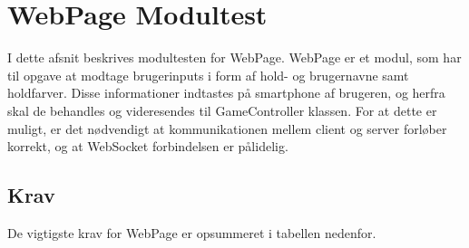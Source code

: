 \documentclass[Modultest/Modultest_main.tex]{subfiles}
\begin{document}
\lstset{style=customc}

\section{WebPage Modultest}\label{webpage_modultest}
I dette afsnit beskrives modultesten for WebPage. WebPage er et modul, som har til opgave at modtage brugerinputs i form af hold- og brugernavne samt holdfarver. Disse informationer indtastes på smartphone af brugeren, og herfra skal de behandles og videresendes til GameController klassen. For at dette er muligt, er det nødvendigt at kommunikationen mellem client og server forløber korrekt, og at WebSocket forbindelsen er pålidelig.

\subsection{Krav}
De vigtigste krav for WebPage er opsummeret i tabellen nedenfor.
\end{document}

